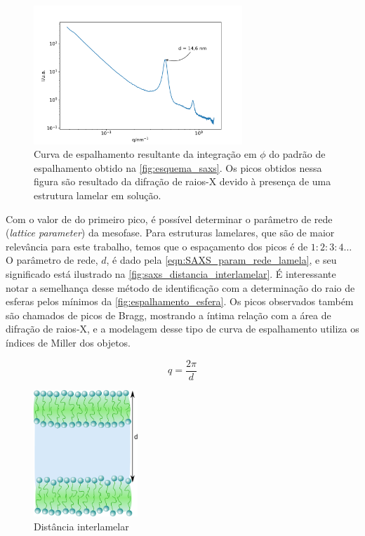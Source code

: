 		\begin{figure}[h]
			\centering
			\includegraphics[width=0.7\textwidth]{imagens/saxs/exemplo_SAXS}
			\caption{Curva de espalhamento resultante da integração em \(\phi\) do padrão de espalhamento obtido na \autoref{fig:esquema_saxs}. Os picos obtidos nessa figura são resultado da difração de raios-X devido à presença de uma estrutura lamelar em solução.}
			\label{fig:exemplo_saxs}
		\end{figure}
		
		Com o valor de \q{} do primeiro pico, é possível determinar o parâmetro de rede (\emph{lattice parameter}) da mesofase.\cite{Percebom2018} Para estruturas lamelares, que são de maior relevância para este trabalho, temos que o espaçamento dos picos é de \(1:2:3:4\dots\)\cite{Narayanan2008a} O parâmetro de rede, \(d\),  é dado pela \autoref{eqn:SAXS_param_rede_lamela}, e seu significado está ilustrado na \autoref{fig:saxs_distancia_interlamelar}. É interessante notar a semelhança desse método de identificação com a determinação do raio de esferas pelos mínimos da \autoref{fig:espalhamento_esfera}. Os picos observados também são chamados de picos de Bragg, mostrando a íntima relação com a área de difração de raios-X, e a modelagem desse tipo de curva de espalhamento utiliza os índices de Miller dos objetos.\cite{Narayanan2008a}
	
		\begin{equation}
			q = \dfrac{2\pi}{d}
			\label{eqn:SAXS_param_rede_lamela}
		\end{equation} 
		
		\begin{figure}[h]
			\centering
			\includegraphics[width=0.35\textwidth]{imagens/saxs/distancia_interlamelar}
			\caption{Distância interlamelar}
			\label{fig:saxs_distancia_interlamelar}
		\end{figure}

